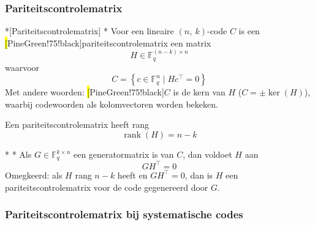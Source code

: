 \subsubsection{Pariteitscontrolematrix}

\begin{nicedefinition}*[Pariteitscontrolematrix]
    \nextpart[]*
    Voor een lineaire $(n,\ k)$-code $C$ is een \hl[PineGreen!75!black]{pariteitscontrolematrix} een matrix
    \begin{equation*}
        H \in \mathbb{F}_q^{(n-k) \times n}
    \end{equation*}
    waarvoor
    \begin{equation*}
        C = \left\{ c \in \mathbb{F}_q^n \mid Hc^\top = 0 \right\}
    \end{equation*}
    Met andere woorden: \hl[PineGreen!75!black]{$C$ is de kern van $H$} ($C = \pm \ker(H)$), waarbij codewoorden als kolomvectoren worden bekeken.
\end{nicedefinition}

Een pariteitscontrolematrix heeft rang
\begin{equation*}
    \operatorname{rank}(H) = n-k
\end{equation*}

\begin{nicelemma}*
    \nextpart[]*
    Als $G \in \mathbb{F}_q^{k \times n}$ een generatormatrix is van $C$, dan voldoet $H$ aan
    \begin{equation*}
        GH^\top = 0
    \end{equation*}
    Omegkeerd: als $H$ rang $n-k$ heeft en $GH^\top = 0$, dan is $H$ een pariteitscontrolematrix voor de code gegenereerd door $G$. 
\end{nicelemma}

\newpage
\subsubsection{Pariteitscontrolematrix bij systematische codes}

